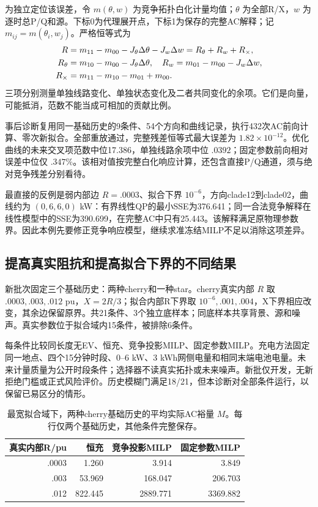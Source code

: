 \documentclass[UTF8,fontset=fandol,11pt,a4paper]{ctexart}
\begin{document}
为独立定位该误差，令 $m(\theta,w)$ 为竞争拓扑白化计量均值；$\theta$ 为全部R/X，$w$ 为逐时总P/Q和源。下标0为代理展开点，下标1为保存的完整AC解释；记 $m_{ij}=m(\theta_i,w_j)$。严格恒等式为
\begin{align}
 R&=m_{11}-m_{00}-J_\theta\Delta\theta-J_w\Delta w
     =R_\theta+R_w+R_\times,\notag\\
 R_\theta&=m_{10}-m_{00}-J_\theta\Delta\theta,\quad
 R_w=m_{01}-m_{00}-J_w\Delta w,\notag\\
 R_\times&=m_{11}-m_{10}-m_{01}+m_{00}.
 \label{pm:cross}
\end{align}
三项分别测量单独线路变化、单独状态变化及二者共同变化的余项。它们是向量，可能抵消，范数不能当成可相加的贡献比例。

事后诊断复用同一基础历史的9条件、54个方向和曲线记录，执行432次AC前向计算、零次新拟合。全部重放通过，完整残差恒等式最大误差为 $1.82\times10^{-12}$。优化曲线的未来交叉项范数中位17.386，单独线路余项中位 $.0392$；固定参数前向相对误差中位仅 $.347\%$。该相对值按完整白化响应计算，还包含直接P/Q通道，须与绝对竞争残差分别看待。

最直接的反例是弱内部边 $R=.0003$、拟合下界 $10^{-6}$，方向clade12到clade02，曲线约为 $(0,6,6,0)$ kW：有界线性QP的最小SSE为376.641；同一合法竞争解释在线性模型中的SSE为390.699，在完整AC中只有25.443。该解释满足原物理参数界。因此本例先要修正竞争响应模型，继续求准冻结MILP不足以消除这项差异。

\subsection{提高真实阻抗和提高拟合下界的不同结果}
新批次固定三个基础历史：两种cherry和一种star。cherry真实内部 $R$ 取 $.0003,.003,.012$ pu，$X=2R/3$；拟合内部R下界取 $10^{-6},.001,.004$，X下界相应改变，其余边保留原界。共21条件、3个独立底样本；同底样本共享背景、源和噪声。真实参数位于拟合域内15条件，被排除6条件。

每条件比较同长度无EV、恒充、竞争投影MILP、固定参数MILP。充电方法固定同一地点、四个15分钟时段、0--6 kW、3 kWh网侧电量和相同末端电池电量。未来计量质量为公开时段条件；选择器不读真实拓扑或未来噪声。新批仅开发，无新拒绝门槛或正式风险评价。历史模糊门满足18/21，但本诊断对全部条件运行，以保留已易区分的情形。

\begin{table}[htbp]
 \centering\small
 \caption{最宽拟合域下，两种cherry基础历史的平均实际AC裕量 $M$。每行仅两个基础历史，其他条件完整保存。}
 \label{pm:scale}
 \begin{tabular}{rrrr}
 \toprule
 真实内部R/pu & 恒充 & 竞争投影MILP & 固定参数MILP\\
 \midrule
 .0003 & 1.260 & 3.914 & 3.849\\
 .003  & 53.969 & 168.047 & 206.703\\
 .012  & 822.445 & 2889.771 & 3369.882\\
 \bottomrule
 \end{tabular}
\end{table}
\end{document}
